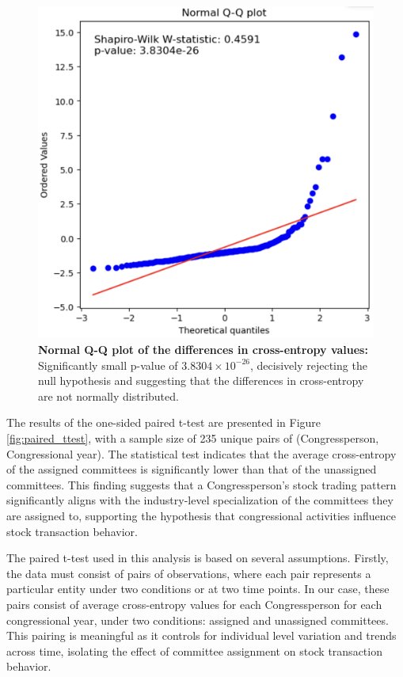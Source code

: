 \documentclass[15pt,letterpaper]{article}
\begin{document}
\begin{figure}[h!]
  \centering
  \includegraphics[width=1\textwidth]{imgs/wstat2.png}
  \caption{\textbf{Normal Q-Q plot of the differences in cross-entropy values:} Significantly small p-value of $3.8304 \times 10^{-26}$, decisively rejecting the null hypothesis and suggesting that the differences in cross-entropy are not normally distributed.}
  \label{fig:wstat}
\end{figure}

The results of the one-sided paired t-test are presented in Figure \ref{fig:paired_ttest}, with a sample size of 235 unique pairs of (Congressperson, Congressional year). The statistical test indicates that the average cross-entropy of the assigned committees is significantly lower than that of the unassigned committees. This finding suggests that a Congressperson's stock trading pattern significantly aligns with the industry-level specialization of the committees they are assigned to, supporting the hypothesis that congressional activities influence stock transaction behavior.

The paired t-test used in this analysis is based on several assumptions. Firstly, the data must consist of pairs of observations, where each pair represents a particular entity under two conditions or at two time points. In our case, these pairs consist of average cross-entropy values for each Congressperson for each congressional year, under two conditions: assigned and unassigned committees. This pairing is meaningful as it controls for individual level variation and trends across time, isolating the effect of committee assignment on stock transaction behavior.
\end{document}
